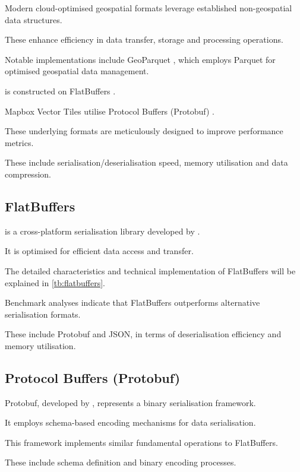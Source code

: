 Modern cloud-optimised geospatial formats leverage established non-geospatial data structures.

These enhance efficiency in data transfer, storage and processing operations.

Notable implementations include GeoParquet \citep{geoparquet}, which employs Parquet \citep{parquet} for optimised geospatial data management.

\citet{flatgeobuf} is constructed on FlatBuffers \citep{flatbuffers}.

Mapbox Vector Tiles \citep{mapbox-vector-tiles} utilise Protocol Buffers (Protobuf) \citep{protobuf}.

These underlying formats are meticulously designed to improve performance metrics.

These include serialisation/deserialisation speed, memory utilisation and data compression.

\subsection{FlatBuffers}
\label{rw:non_geospatial_formats:flatbuffers}

\citet{flatbuffers} is a cross-platform serialisation library developed by \citet{google_flatbuffers}.

It is optimised for efficient data access and transfer.

The detailed characteristics and technical implementation of FlatBuffers will be explained in \autoref{tb:flatbuffers}.

Benchmark analyses \citep{flatbuffers_benchmark} indicate that FlatBuffers outperforms alternative serialisation formats.

These include Protobuf \citep{protobuf} and JSON, in terms of deserialisation efficiency and memory utilisation.

\subsection{Protocol Buffers (Protobuf)}
\label{rw:non_geospatial_formats:protobuf}

Protobuf, developed by \citet{protobuf}, represents a binary serialisation framework.

It employs schema-based encoding mechanisms for data serialisation.

This framework implements similar fundamental operations to FlatBuffers.

These include schema definition and binary encoding processes.

